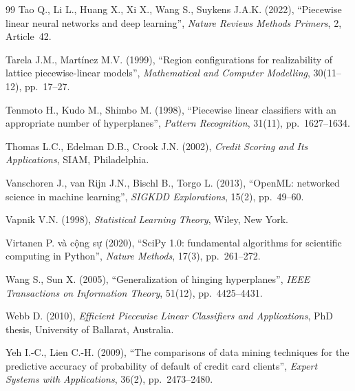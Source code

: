 \begin{thebibliography}{99}
 Tao Q., Li L., Huang X., Xi X., Wang S., Suykens J.A.K. (2022), “Piecewise linear neural networks and deep learning”, \emph{Nature Reviews Methods Primers}, 2, Article~42.

 Tarela J.M., Martínez M.V. (1999), “Region configurations for realizability of lattice piecewise-linear models”, \emph{Mathematical and Computer Modelling}, 30(11--12), pp.~17--27.

 Tenmoto H., Kudo M., Shimbo M. (1998), “Piecewise linear classifiers with an appropriate number of hyperplanes”, \emph{Pattern Recognition}, 31(11), pp.~1627--1634.

 Thomas L.C., Edelman D.B., Crook J.N. (2002), \emph{Credit Scoring and Its Applications}, SIAM, Philadelphia.

 Vanschoren J., van Rijn J.N., Bischl B., Torgo L. (2013), “OpenML: networked science in machine learning”, \emph{SIGKDD Explorations}, 15(2), pp.~49--60.

 Vapnik V.N. (1998), \emph{Statistical Learning Theory}, Wiley, New York.

 Virtanen P. và cộng sự (2020), “SciPy 1.0: fundamental algorithms for scientific computing in Python”, \emph{Nature Methods}, 17(3), pp.~261--272.

 Wang S., Sun X. (2005), “Generalization of hinging hyperplanes”, \emph{IEEE Transactions on Information Theory}, 51(12), pp.~4425--4431.

 Webb D. (2010), \emph{Efficient Piecewise Linear Classifiers and Applications}, PhD thesis, University of Ballarat, Australia.

 Yeh I.-C., Lien C.-H. (2009), “The comparisons of data mining techniques for the predictive accuracy of probability of default of credit card clients”, \emph{Expert Systems with Applications}, 36(2), pp.~2473--2480.

\end{thebibliography}
\endgroup
